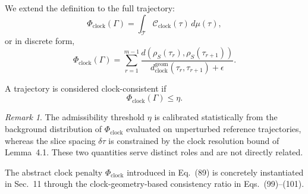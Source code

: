 \documentclass[11pt,a4paper]{article}
\theoremstyle{definition}
\theoremstyle{remark}
\newtheorem{remark}[theorem]{Remark}
\begin{document}
We extend the definition to the full trajectory:
\begin{equation}
\Phi_{\mathrm{clock}}(\Gamma)
=
\int_{\mathcal{T}}
\mathcal{C}_{\mathrm{clock}}(\tau)
\, d\mu(\tau),
\end{equation}
or in discrete form,
\begin{equation}
\Phi_{\mathrm{clock}}(\Gamma)
=
\sum_{r=1}^{m-1}
\frac{
d\!\left(\rho_S(\tau_r),\rho_S(\tau_{r+1})\right)
}{
d_{\mathrm{clock}}^{\mathrm{geom}}(\tau_r,\tau_{r+1}) + \epsilon
}.
\end{equation}

A trajectory is considered clock-consistent if
\begin{equation}
\Phi_{\mathrm{clock}}(\Gamma) \le \eta.
\end{equation}

\begin{remark}
The admissibility threshold $\eta$ is calibrated statistically 
from the background distribution of $\Phi_{\mathrm{clock}}$ 
evaluated on unperturbed reference trajectories, whereas the 
slice spacing $\delta\tau$ is constrained by the clock resolution 
bound of Lemma~4.1. These two quantities serve distinct roles 
and are not directly related.
\end{remark}

The abstract clock penalty $\Phi_{\mathrm{clock}}$ introduced in 
Eq.~(89) is concretely instantiated in Sec.~11 through the 
clock-geometry-based consistency ratio in Eqs.~(99)--(101).
\end{document}
